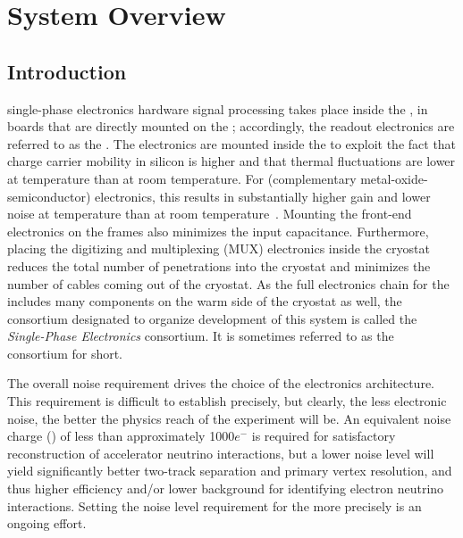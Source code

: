 \section{System Overview}
\label{sec:fdsp-tpcelec-overview}


\subsection{Introduction}
\label{sec:fdsp-tpcelec-overview-intro}


 single-phase  electronics hardware signal processing takes place inside the , in boards that are directly mounted on the ; accordingly, the  readout electronics are referred to as the .  The electronics are mounted inside the  to exploit the fact that charge carrier mobility in silicon is higher and that thermal fluctuations are lower at  temperature than at room temperature.  For  (complementary metal-oxide-semiconductor) electronics, this results in substantially higher gain and lower noise at  temperature than at room temperature~\cite{larCMOS}.  Mounting the front-end electronics on the  frames also minimizes the input capacitance.  Furthermore, placing the digitizing and multiplexing (MUX) electronics inside the cryostat reduces the total number of penetrations into the cryostat and minimizes the number of cables coming out of the cryostat.  As the full  electronics chain for the  includes many components on the warm side of the cryostat as well, the  consortium designated to organize development of this system is called the  \textit{Single-Phase  Electronics} consortium. It is sometimes referred to as the  consortium for short.

The overall noise requirement drives the choice of the  electronics architecture. This requirement is difficult to establish precisely, but clearly, the less electronic noise, the better the physics reach of the  experiment will be.  An equivalent noise charge () of less than approximately 1000$e^-$ is required for satisfactory reconstruction of accelerator neutrino interactions, but a lower noise level will yield significantly better two-track separation and primary vertex resolution, and thus higher efficiency and/or lower background for identifying electron neutrino interactions.  Setting the noise level requirement for the   more precisely is an ongoing effort.

